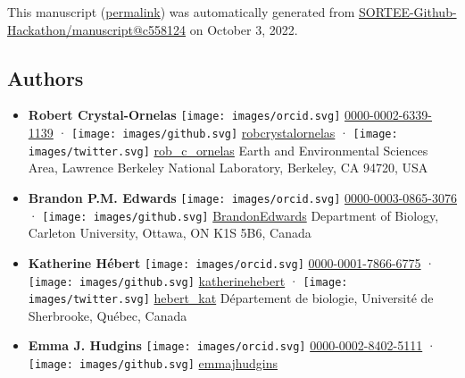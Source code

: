 This manuscript
(\href{https://SORTEE-Github-Hackathon.github.io/manuscript/v/c5581246d860e031bbed754e4a7d18ff1ae072b2/}{permalink})
was automatically generated
from \href{https://github.com/SORTEE-Github-Hackathon/manuscript/tree/c5581246d860e031bbed754e4a7d18ff1ae072b2}{SORTEE-Github-Hackathon/manuscript@c558124}
on October 3, 2022.

\hypertarget{authors}{%
\subsection{Authors}\label{authors}}

\begin{itemize}
\item
  \textbf{Robert Crystal-Ornelas}
  \texttt{[image: images/orcid.svg]}
  \href{https://orcid.org/0000-0002-6339-1139}{0000-0002-6339-1139}
  · \texttt{[image: images/github.svg]}
  \href{https://github.com/robcrystalornelas}{robcrystalornelas}
  · \texttt{[image: images/twitter.svg]}
  \href{https://twitter.com/rob_c_ornelas}{rob\_c\_ornelas}
  Earth and Environmental Sciences Area, Lawrence Berkeley National Laboratory, Berkeley, CA 94720, USA
\item
  \textbf{Brandon P.M. Edwards}
  \texttt{[image: images/orcid.svg]}
  \href{https://orcid.org/0000-0003-0865-3076}{0000-0003-0865-3076}
  · \texttt{[image: images/github.svg]}
  \href{https://github.com/BrandonEdwards}{BrandonEdwards}
  Department of Biology, Carleton University, Ottawa, ON K1S 5B6, Canada
\item
  \textbf{Katherine Hébert}
  \texttt{[image: images/orcid.svg]}
  \href{https://orcid.org/0000-0001-7866-6775}{0000-0001-7866-6775}
  · \texttt{[image: images/github.svg]}
  \href{https://github.com/katherinehebert}{katherinehebert}
  · \texttt{[image: images/twitter.svg]}
  \href{https://twitter.com/hebert_kat}{hebert\_kat}
  Département de biologie, Université de Sherbrooke, Québec, Canada
\item
  \textbf{Emma J. Hudgins}
  \texttt{[image: images/orcid.svg]}
  \href{https://orcid.org/0000-0002-8402-5111}{0000-0002-8402-5111}
  · \texttt{[image: images/github.svg]}
  \href{https://github.com/emmajhudgins}{emmajhudgins}

\end{itemize}
